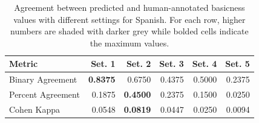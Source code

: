 \documentclass[preprint,12pt,authoryear]{elsarticle}
\begin{document}
\begin{table}[ht]
\centering
\caption{Agreement between predicted and human-annotated basicness values with different settings for Spanish. For each row, higher numbers are shaded with darker grey while bolded cells indicate the maximum values.}
\label{tab:agreement_scores_comparison_es}
\begin{tabular}{@{}l r r r r r@{}}
\toprule
\textbf{Metric} & \textbf{Set. 1} & \textbf{Set. 2} & \textbf{Set. 3} & \textbf{Set. 4} & \textbf{Set. 5} \\ 
\midrule
Binary Agreement     & \cellcolor{gray!85} \textbf{0.8375} & \cellcolor{gray!58} 0.6750 & \cellcolor{gray!32} 0.4375 & \cellcolor{gray!38} 0.5000 & \cellcolor{gray!18} 0.2375 \\
Percent Agreement    & \cellcolor{gray!22} 0.1875 & \cellcolor{gray!53} \textbf{0.4500} & \cellcolor{gray!25} 0.2375 & \cellcolor{gray!15} 0.1500 & \cellcolor{gray!5} 0.0250 \\
Cohen Kappa          & \cellcolor{gray!7} 0.0548 & \cellcolor{gray!10} \textbf{0.0819} & \cellcolor{gray!6} 0.0447 & \cellcolor{gray!5} 0.0250 & \cellcolor{gray!3} 0.0094 \\
\bottomrule
\end{tabular}
\smallskip
\end{table}






\end{document}
